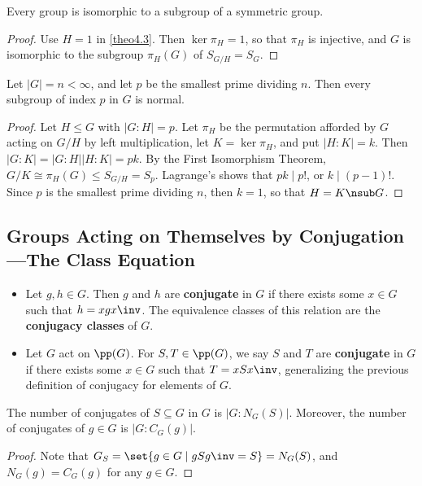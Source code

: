  \label{cor4.4}
Every group is isomorphic to a subgroup of a symmetric group.
\begin{proof}
    Use $H = 1$ in \autoref{theo4.3}. Then $\ker\pi_H = 1$, so that $\pi_H$ is injective, and $G$ is isomorphic to the subgroup $\pi_H(G)$ of $S_{G/H} = S_G$.
\end{proof}

 \label{cor4.5}
Let $|G| = n < \infty$, and let $p$ be the smallest prime dividing $n$. Then every subgroup of index $p$ in $G$ is normal.

\begin{proof}
    Let $H \leq G$ with $|G : H| = p$. Let $\pi_H$ be the permutation afforded by $G$ acting on $G/H$ by left multiplication, let $K = \ker\pi_H$, and put $|H : K| = k$. Then $|G : K| = |G : H||H : K| = pk$. By the First Isomorphism Theorem, $G/K \cong \pi_H(G) \leq S_{G/H} = S_p$. Lagrange's shows that $pk \mid p!$, or $k \mid (p - 1)!$. Since $p$ is the smallest prime dividing $n$, then $k = 1$, so that $H = K \nsub G$.
\end{proof}

\newpage

\subsection{Groups Acting on Themselves by Conjugation---The Class Equation} \label{sec4.3}

\begin{itemize}
    \item Let $g, h \in G$. Then $g$ and $h$ are \textbf{conjugate} in $G$ if there exists some $x \in G$ such that $h = xgx\inv$. The equivalence classes of this relation are the \textbf{conjugacy classes} of $G$.
    \item Let $G$ act on $\pp(G)$. For $S, T \in \pp(G)$, we say $S$ and $T$ are \textbf{conjugate} in $G$ if there exists some $x \in G$ such that $T = xSx\inv$, generalizing the previous definition of conjugacy for elements of $G$.
\end{itemize}

 \label{prop4.6}
The number of conjugates of $S \subseteq G$ in $G$ is $|G : N_G(S)|$. Moreover, the number of conjugates of $g \in G$ is $|G : C_G(g)|$.

\begin{proof}
    Note that $G_S = \set{g \in G \mid gSg\inv = S} = N_G(S)$, and $N_G(g) = C_G(g)$ for any $g \in G$.
\end{proof}

